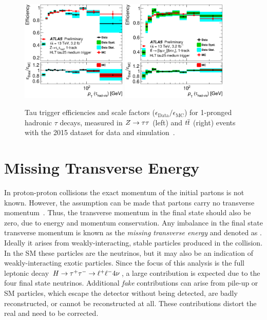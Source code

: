 \begin{figure}
    \centering
    \includegraphics[width=0.45\textwidth]{./figures/object_selection/tau_trig_eff_ztt_1p.eps}
    \includegraphics[width=0.45\textwidth]{./figures/object_selection/tau_trig_eff_tt_1p.eps}
    \caption{Tau trigger efficiencies and scale factors ($\epsilon_\text{Data} / \epsilon_\text{MC}$) for 1-pronged
    hadronic $\tau$ decays, measured in $Z \to \tau\tau$ (left) and $t\overline{t}$ (right) events with
    the 2015 dataset for data and simulation~\cite{ATLAS-CONF-2017-029}.}\label{fig:object_selection:tau_eff}
\end{figure}


\section{Missing Transverse Energy}\label{sec:object_selection:missing_transverse_energy}

In proton-proton collisions the exact momentum of the initial partons is not known.
However, the assumption can be made that partons carry no transverse momentum~\cite{PhysRev.185.1975}.
Thus, the transverse momentum in the final state should also be zero, due to energy and momentum conservation.
Any imbalance in the final state transverse momentum is known as the \emph{missing transverse energy} and denoted as \etmiss.
Ideally it arises from weakly-interacting, stable particles produced in the collision.
In the SM these particles are the neutrinos, but it may also be an indication of weakly-interacting exotic particles.
Since the focus of this analysis is the full leptonic decay $H \to \tau^+\tau^- \to \ell^+\ell^- 4\nu$, a large \etmiss{} contribution is expected
due to the four final state neutrinos.
Additional \emph{fake} \etmiss{} contributions can arise from pile-up or SM particles, which escape the detector without
being detected, are badly reconstructed, or cannot be reconstructed at all. These contributions distort the real \etmiss{}
and need to be corrected.

